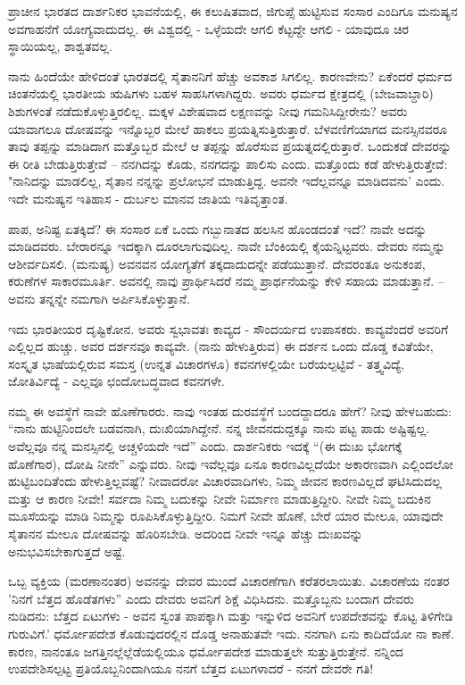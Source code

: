 ಪ್ರಾಚೀನ ಭಾರತದ ದಾರ್ಶನಿಕರ ಭಾವನೆಯಲ್ಲಿ, ಈ ಕಲುಷಿತವಾದ, ಜಿಗುಪ್ಸೆ ಹುಟ್ಟಿಸುವ ಸಂಸಾರ ಎಂದಿಗೂ ಮನುಷ್ಯನ ಅವಗಾಹನೆಗೆ ಯೋಗ್ಯವಾದುದಲ್ಲ. ಈ ವಿಶ್ವದಲ್ಲಿ - ಒಳ್ಳೆಯದೇ ಆಗಲಿ ಕೆಟ್ಟದ್ದೇ ಆಗಲಿ - ಯಾವುದೂ ಚಿರ ಸ್ಥಾಯಿಯಲ್ಲ, ಶಾಶ್ವತವಲ್ಲ.

ನಾನು ಹಿಂದೆಯೇ ಹೇಳಿದಂತೆ ಭಾರತದಲ್ಲಿ ಸೈತಾನನಿಗೆ ಹೆಚ್ಚು ಅವಕಾಶ ಸಿಗಲಿಲ್ಲ. ಕಾರಣವೇನು? ಏಕೆಂದರೆ ಧರ್ಮದ ಚಿಂತನೆಯಲ್ಲಿ ಭಾರತೀಯ ಋಷಿಗಳು ಬಹಳ ಸಾಹಸಿಗಳಾಗಿದ್ದರು. ಅವರು ಧರ್ಮದ ಕ್ಷೇತ್ರದಲ್ಲಿ (ಬೇಜವಾಬ್ದಾರಿ) ಶಿಶುಗಳಂತೆ ನಡೆದುಕೊಳ್ಳುತ್ತಿರಲಿಲ್ಲ. ಮಕ್ಕಳ ವಿಶೇಷವಾದ ಲಕ್ಷಣವನ್ನು ನೀವು ಗಮನಿಸಿದ್ದೀರೇನು? ಅವರು ಯಾವಾಗಲೂ ದೋಷವನ್ನು ಇನ್ನೊಬ್ಬರ ಮೇಲೆ ಹಾಕಲು ಪ್ರಯತ್ನಿಸುತ್ತಿರುತ್ತಾರೆ. ಬೆಳವಣಿಗೆಯಾಗದ ಮನಸ್ಸಿನವರೂ ತಾವು ತಪ್ಪನ್ನು ಮಾಡಿದಾಗ ಮತ್ತೊಬ್ಬರ ಮೇಲೆ ಆ ತಪ್ಪನ್ನು ಹೊರೆಸುವ ಪ್ರಯತ್ನದಲ್ಲಿರುತ್ತಾರೆ. ಒಂದುಕಡೆ ದೇವರನ್ನು ಈ ರೀತಿ ಬೇಡುತ್ತಿರುತ್ತೇವೆ – ನನಗಿದನ್ನು ಕೊಡು, ನನಗದನ್ನು ಪಾಲಿಸು ಎಂದು. ಮತ್ತೊಂದು ಕಡೆ ಹೇಳುತ್ತಿರುತ್ತೇವೆ: "ನಾನಿದನ್ನು ಮಾಡಲಿಲ್ಲ, ಸೈತಾನ ನನ್ನನ್ನು ಪ್ರಲೋಭನೆ ಮಾಡುತ್ತಿದ್ದ. ಅವನೇ ಇದೆಲ್ಲವನ್ನೂ ಮಾಡಿದವನು' ಎಂದು. ಇದೇ ಮನುಷ್ಯನ ಇತಿಹಾಸ - ದುರ್ಬಲ ಮಾನವ ಜಾತಿಯ ಇತಿವೃತ್ತಾಂತ.

ಪಾಪ, ಅನಿಷ್ಟ ಏತಕ್ಕಿದೆ? ಈ ಸಂಸಾರ ಏಕೆ ಒಂದು ಗಬ್ಬುನಾತದ ಹಲಸಿನ ಹೊಂಡದಂತೆ ಇದೆ? ನಾವೇ ಅದನ್ನು ಮಾಡಿದವರು. ಬೇರಾರನ್ನೂ ಇದಕ್ಕಾಗಿ ದೂರಲಾಗುವುದಿಲ್ಲ. ನಾವೇ ಬೆಂಕಿಯಲ್ಲಿ ಕೈಯನ್ನಿಟ್ಟವರು. ದೇವರು ನಮ್ಮನ್ನು ಆಶೀರ್ವದಿಸಲಿ. (ಮನುಷ್ಯ) ಅವನವನ ಯೋಗ್ಯತೆಗೆ ತಕ್ಕದಾದುದನ್ನೇ ಪಡೆಯುತ್ತಾನೆ. ದೇವರಂತೂ ಅನುಕಂಪ, ಕರುಣೆಗಳ ಸಾಕಾರಮೂರ್ತಿ. ಅವನಲ್ಲಿ ನಾವು ಪ್ರಾರ್ಥಿಸಿದರೆ ನಮ್ಮ ಪ್ರಾರ್ಥನೆಯನ್ನು ಕೇಳಿ ಸಹಾಯ ಮಾಡುತ್ತಾನೆ. – ಅವನು ತನ್ನನ್ನೇ ನಮಗಾಗಿ ಅರ್ಪಿಸಿಕೊಳ್ಳುತ್ತಾನೆ.

ಇದು ಭಾರತೀಯರ ದೃಷ್ಟಿಕೋನ. ಅವರು ಸ್ವಭಾವತಃ ಕಾವ್ಯದ - ಸೌಂದರ್ಯದ ಉಪಾಸಕರು. ಕಾವ್ಯವೆಂದರೆ ಅವರಿಗೆ ಎಲ್ಲಿಲ್ಲದ ಹುಚ್ಚು. ಅವರ ದರ್ಶನವೂ ಕಾವ್ಯವೇ. (ನಾನು ಹೇಳುತ್ತಿರುವ) ಈ ದರ್ಶನ ಒಂದು ದೊಡ್ಡ ಕವಿತೆಯೇ, ಸಂಸ್ಕೃತ ಭಾಷೆಯಲ್ಲಿರುವ ಸಮಸ್ತ (ಉನ್ನತ ವಿಚಾರಗಳೂ) ಕವನಗಳಲ್ಲಿಯೇ ಬರೆಯಲ್ಪಟ್ಟಿವೆ - ತತ್ತ್ವವಿದ್ಯೆ, ಜೋತಿರ್ವಿದ್ಯೆ - ಎಲ್ಲವೂ ಛಂದೋಬದ್ಧವಾದ ಕವನಗಳೇ.

ನಮ್ಮ ಈ ಅವಸ್ಥೆಗೆ ನಾವೇ ಹೊಣೆಗಾರರು. ನಾವು ಇಂತಹ ದುರವಸ್ಥೆಗೆ ಬಂದದ್ದಾದರೂ ಹೇಗೆ? ನೀವು ಹೇಳಬಹುದು: “ನಾನು ಹುಟ್ಟಿನಿಂದಲೇ ಬಡವನಾಗಿ, ದುಃಖಿಯಾಗಿದ್ದೇನೆ. ನನ್ನ ಜೀವನದುದ್ದಕ್ಕೂ ನಾನು ಪಟ್ಟ ಪಾಡು ಅಷ್ಟಿಷ್ಟಲ್ಲ. ಅವೆಲ್ಲವೂ ನನ್ನ ಮನಸ್ಸಿನಲ್ಲಿ ಅಚ್ಚಳಿಯದೇ ಇದೆ'' ಎಂದು. ದಾರ್ಶನಿಕರು ಇದಕ್ಕೆ “(ಈ ದುಃಖ ಭೋಗಕ್ಕೆ ಹೊಣೆಗಾರ), ದೋಷಿ ನೀನೇ'' ಎನ್ನುವರು. ನೀವು ಇವೆಲ್ಲವೂ ಏನೂ ಕಾರಣವಿಲ್ಲದೆಯೇ ಅಕಾರಣವಾಗಿ ಎಲ್ಲಿಂದಲೋ ಹುಟ್ಟಿಬಂದಿತೆಂದು ಹೇಳುತ್ತಿಲ್ಲವಷ್ಟೆ? ನೀವಾದರೋ ವಿಚಾರವಾದಿಗಳು, ನಿಮ್ಮ ಜೀವನ ಕಾರಣವಿಲ್ಲದೆ ಘಟಿಸಿದುದಲ್ಲ ಮತ್ತು ಆ ಕಾರಣ ನೀವೇ! ಸರ್ವದಾ ನಿಮ್ಮ ಬದುಕನ್ನು ನೀವೇ ನಿರ್ಮಾಣ ಮಾಡುತ್ತಿದ್ದೀರಿ. ನೀವೇ ನಿಮ್ಮ ಬದುಕಿನ ಮೂಸೆಯನ್ನು ಮಾಡಿ ನಿಮ್ಮನ್ನು ರೂಪಿಸಿಕೊಳ್ಳುತ್ತಿದ್ದೀರಿ. ನಿಮಗೆ ನೀವೇ ಹೊಣೆ, ಬೇರೆ ಯಾರ ಮೇಲೂ, ಯಾವುದೇ ಸೈತಾನನ ಮೇಲೂ ದೋಷವನ್ನು ಹೊರಿಸಬೇಡಿ. ಅದರಿಂದ ನೀವೇ ಇನ್ನೂ ಹೆಚ್ಚು ದುಃಖವನ್ನು ಅನುಭವಿಸಬೇಕಾಗುತ್ತದೆ ಅಷ್ಟೆ.

ಒಬ್ಬ ವ್ಯಕ್ತಿಯ (ಮರಣಾನಂತರ) ಅವನನ್ನು ದೇವರ ಮುಂದೆ ವಿಚಾರಣೆಗಾಗಿ ಕರೆತರಲಾಯಿತು. ವಿಚಾರಣೆಯ ನಂತರ 'ನಿನಗೆ  ಬೆತ್ತದ ಹೊಡೆತಗಳು'' ಎಂದು ದೇವರು ಅವನಿಗೆ ಶಿಕ್ಷೆ ವಿಧಿಸಿದನು. ಮತ್ತೊಬ್ಬನು ಬಂದಾಗ ದೇವರು ನುಡಿದನು:  ಬೆತ್ತದ ಏಟುಗಳು -  ಅವನ ಸ್ವಂತ ಪಾಪಕ್ಕಾಗಿ ಮತ್ತು ಇನ್ನುಳಿದ  ಅವನಿಗೆ ಉಪದೇಶವನ್ನು ಕೊಟ್ಟ ತಿಳಿಗೇಡಿ ಗುರುವಿಗೆ.' ಧರ್ಮೋಪದೇಶ ಕೊಡುವುದರಲ್ಲಿನ ದೊಡ್ಡ ಅನಾಹುತವೇ ಇದು. ನನಗಾಗಿ ಏನು ಕಾದಿದೆಯೋ ನಾ ಕಾಣೆ. ಕಾರಣ, ನಾನಂತೂ ಜಗತ್ತಿನಲ್ಲೆಲ್ಲೆಡೆಯಲ್ಲಿಯೂ ಧರ್ಮೋಪದೇಶ ಮಾಡುತ್ತಲೇ ಸುತ್ತುತ್ತಿರುತ್ತೇನೆ. ನನ್ನಿಂದ ಉಪದೇಶಿಸಲ್ಪಟ್ಟ ಪ್ರತಿಯೊಬ್ಬನಿಂದಾಗಿಯೂ ನನಗೆ  ಬೆತ್ತದ ಏಟುಗಳಾದರೆ - ನನಗೆ ದೇವರೇ ಗತಿ!

